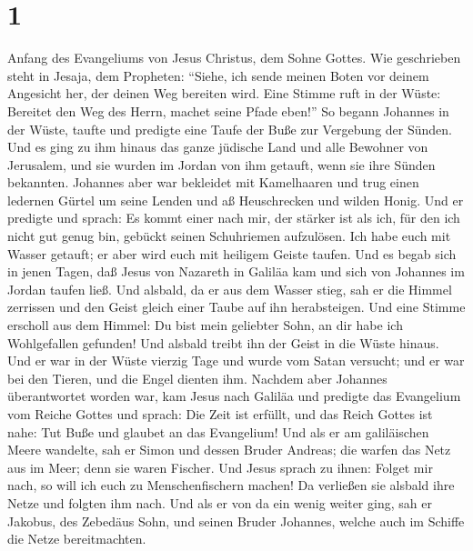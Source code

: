 \hypertarget{section}{%
\section{1}\label{section}}

 Anfang des Evangeliums von Jesus Christus, dem Sohne
Gottes.  Wie geschrieben steht in Jesaja, dem Propheten:
``Siehe, ich sende meinen Boten vor deinem Angesicht her, der deinen Weg
bereiten wird.  Eine Stimme ruft in der Wüste: Bereitet
den Weg des Herrn, machet seine Pfade eben!''  So begann
Johannes in der Wüste, taufte und predigte eine Taufe der Buße zur
Vergebung der Sünden.  Und es ging zu ihm hinaus das ganze
jüdische Land und alle Bewohner von Jerusalem, und sie wurden im Jordan
von ihm getauft, wenn sie ihre Sünden bekannten.  Johannes
aber war bekleidet mit Kamelhaaren und trug einen ledernen Gürtel um
seine Lenden und aß Heuschrecken und wilden Honig.  Und er
predigte und sprach: Es kommt einer nach mir, der stärker ist als ich,
für den ich nicht gut genug bin, gebückt seinen Schuhriemen aufzulösen.
 Ich habe euch mit Wasser getauft; er aber wird euch mit
heiligem Geiste taufen.  Und es begab sich in jenen Tagen,
daß Jesus von Nazareth in Galiläa kam und sich von Johannes im Jordan
taufen ließ.  Und alsbald, da er aus dem Wasser stieg,
sah er die Himmel zerrissen und den Geist gleich einer Taube auf ihn
herabsteigen.  Und eine Stimme erscholl aus dem Himmel:
Du bist mein geliebter Sohn, an dir habe ich Wohlgefallen gefunden!
 Und alsbald treibt ihn der Geist in die Wüste hinaus.
 Und er war in der Wüste vierzig Tage und wurde vom Satan
versucht; und er war bei den Tieren, und die Engel dienten ihm.
 Nachdem aber Johannes überantwortet worden war, kam
Jesus nach Galiläa und predigte das Evangelium vom Reiche Gottes
 und sprach: Die Zeit ist erfüllt, und das Reich Gottes
ist nahe: Tut Buße und glaubet an das Evangelium!  Und
als er am galiläischen Meere wandelte, sah er Simon und dessen Bruder
Andreas; die warfen das Netz aus im Meer; denn sie waren Fischer.
 Und Jesus sprach zu ihnen: Folget mir nach, so will ich
euch zu Menschenfischern machen!  Da verließen sie
alsbald ihre Netze und folgten ihm nach.  Und als er von
da ein wenig weiter ging, sah er Jakobus, des Zebedäus Sohn, und seinen
Bruder Johannes, welche auch im Schiffe die Netze bereitmachten.

